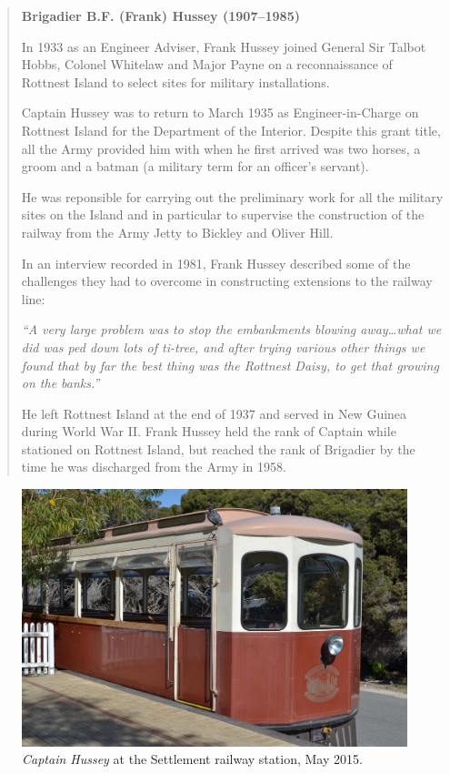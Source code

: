 \begin{quotation}
\begin{center}
\textbf{Brigadier B.F. (Frank) Hussey (1907--1985)}
\end{center}

In 1933 as an Engineer Adviser, Frank Hussey joined General Sir Talbot Hobbs, Colonel Whitelaw and Major Payne on a reconnaissance of Rottnest Island to select sites for military installations.

Captain Hussey was to return to March 1935 as Engineer-in-Charge on Rottnest Island for the Department of the Interior. Despite this grant title, all the Army provided him with when he first arrived was two horses, a groom and a batman (a military term for an officer's servant).

He was reponsible for carrying out the preliminary work for all the military sites on the Island and in particular to supervise the construction of the railway from the Army Jetty to Bickley and Oliver Hill.

In an interview recorded in 1981, Frank Hussey described some of the challenges they had to overcome in constructing extensions to the railway line:

\emph{``A very large problem was to stop the embankments blowing away\dots what we did was ped down lots of ti-tree, and after trying various other things we found that by far the best thing was the Rottnest Daisy, to get that growing on the banks.''}

He left Rottnest Island at the end of 1937 and served in New Guinea during World War II. Frank Hussey held the rank of Captain while stationed on Rottnest Island, but reached the rank of Brigadier by the time he was discharged from the Army in 1958.
\end{quotation}

\begin{figure}
 \label{CaptainHussey}
 \includegraphics[width=\textwidth]{photos/Captain_Hussey}
 \caption{\emph{Captain Hussey} at the Settlement railway station, May 2015.\cite{CaptainHusseyPhoto}}
\end{figure}
